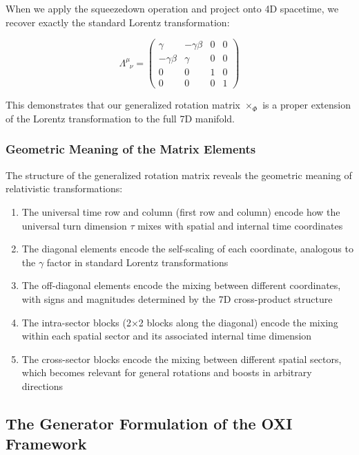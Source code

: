 \documentclass{article}
\begin{document}
When we apply the squeezedown operation and project onto 4D spacetime, we recover exactly the standard Lorentz transformation:

\begin{equation}
\Lambda^\mu_{\;\;\nu} = \begin{pmatrix}
\gamma & -\gamma\beta & 0 & 0 \\
-\gamma\beta & \gamma & 0 & 0 \\
0 & 0 & 1 & 0 \\
0 & 0 & 0 & 1
\end{pmatrix}
\end{equation}

This demonstrates that our generalized rotation matrix $\times_\Phi$ is a proper extension of the Lorentz transformation to the full 7D manifold.

\subsubsection{Geometric Meaning of the Matrix Elements}

The structure of the generalized rotation matrix reveals the geometric meaning of relativistic transformations:

\begin{enumerate}
\item The universal time row and column (first row and column) encode how the universal turn dimension $\tau$ mixes with spatial and internal time coordinates

\item The diagonal elements encode the self-scaling of each coordinate, analogous to the $\gamma$ factor in standard Lorentz transformations

\item The off-diagonal elements encode the mixing between different coordinates, with signs and magnitudes determined by the 7D cross-product structure

\item The intra-sector blocks (2×2 blocks along the diagonal) encode the mixing within each spatial sector and its associated internal time dimension

\item The cross-sector blocks encode the mixing between different spatial sectors, which becomes relevant for general rotations and boosts in arbitrary directions
\end{enumerate}

\subsection{The Generator Formulation of the OXI Framework}
\end{document}
